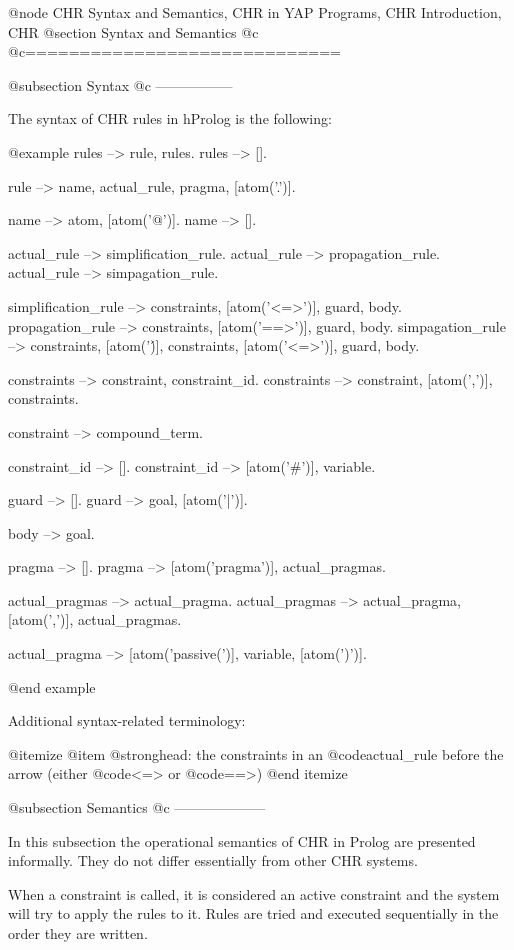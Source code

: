 @node CHR Syntax and Semantics, CHR in YAP Programs, CHR Introduction, CHR
@section Syntax and Semantics
@c		\label{sec:SyntaxAndSemantics}
@c=============================

@subsection Syntax
@c -----------------

The syntax of CHR rules in hProlog is the following:

@example
rules --> rule, rules.
rules --> [].

rule --> name, actual_rule, pragma, [atom('.')].

name --> atom, [atom('@')].
name --> [].

actual_rule --> simplification_rule.
actual_rule --> propagation_rule.
actual_rule --> simpagation_rule.

simplification_rule --> constraints, [atom('<=>')], guard, body.
propagation_rule --> constraints, [atom('==>')], guard, body.
simpagation_rule --> constraints, [atom('\')], constraints, [atom('<=>')], 
                     guard, body.

constraints --> constraint, constraint_id.
constraints --> constraint, [atom(',')], constraints.

constraint --> compound_term.

constraint_id --> [].
constraint_id --> [atom('#')], variable.

guard --> [].
guard --> goal, [atom('|')].

body --> goal.

pragma --> [].
pragma --> [atom('pragma')], actual_pragmas.

actual_pragmas --> actual_pragma.
actual_pragmas --> actual_pragma, [atom(',')], actual_pragmas.

actual_pragma --> [atom('passive(')], variable, [atom(')')].

@end example

Additional syntax-related terminology:

@itemize
@item @strong{head:} the constraints in an @code{actual_rule} before
                     the arrow (either @code{<=>} or @code{==>})
@end itemize

@subsection Semantics
@c --------------------

In this subsection the operational semantics of CHR in Prolog are presented
informally. They do not differ essentially from other CHR systems.

When a constraint is called, it is considered an active constraint and
the system will try to apply the rules to it. Rules are tried and executed
sequentially in the order they are written. 

